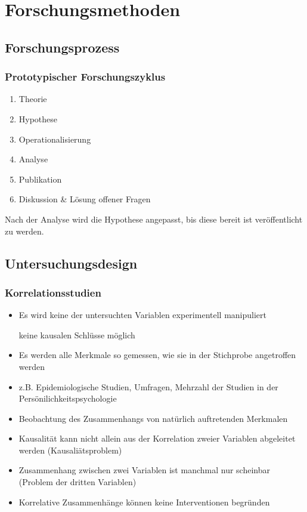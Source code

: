 \section{Forschungsmethoden}
\subsection{Forschungsprozess}
\subsubsection{Prototypischer Forschungszyklus}
\begin{enumerate}
  \item Theorie
  \item Hypothese
  \item Operationalisierung
  \item Analyse
  \item Publikation
  \item Diskussion \& Lösung offener Fragen
\end{enumerate}
Nach der Analyse wird die Hypothese angepasst, bis diese bereit ist veröffentlicht zu werden.
\subsection{Untersuchungsdesign}
\subsubsection{Korrelationsstudien}
\begin{itemize}
	\item Es wird keine der untersuchten Variablen experimentell manipuliert 
	 
		\rightarrow keine kausalen Schlüsse möglich 
	\item Es werden alle Merkmale so gemessen, wie sie in der Stichprobe angetroffen werden
	\item z.B. Epidemiologische Studien, Umfragen, Mehrzahl der Studien in der Persönilichkeitspsychologie
	\item Beobachtung des Zusammenhangs von natürlich auftretenden Merkmalen
	\item Kausalität kann nicht allein aus der Korrelation zweier Variablen abgeleitet werden (Kausaliätsproblem)
	\item Zusammenhang zwischen zwei Variablen ist manchmal nur scheinbar (Problem der dritten Variablen)
	\item Korrelative Zusammenhänge können keine Interventionen begründen
\end{itemize}
